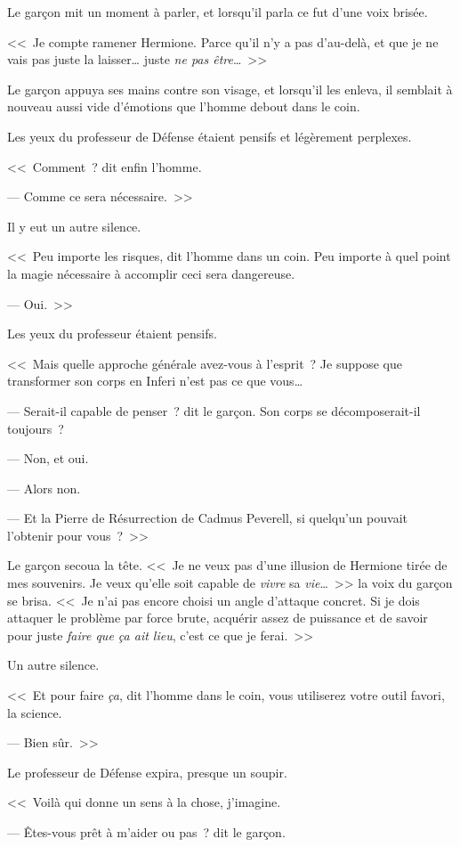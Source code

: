 Le garçon mit un moment à parler, et lorsqu'il parla ce fut d'une voix brisée.

<<~Je compte ramener Hermione. Parce qu'il n'y a pas d'au-delà, et que je ne vais pas juste la laisser… juste \emph{ne pas être}…~>>

Le garçon appuya ses mains contre son visage, et lorsqu'il les enleva, il semblait à nouveau aussi vide d'émotions que l'homme debout dans le coin.

Les yeux du professeur de Défense étaient pensifs et légèrement perplexes.

<<~Comment~? dit enfin l'homme.

--- Comme ce sera nécessaire.~>>

Il y eut un autre silence.

<<~Peu importe les risques, dit l'homme dans un coin. Peu importe à quel point la magie nécessaire à accomplir ceci sera dangereuse.

--- Oui.~>>

Les yeux du professeur étaient pensifs.

<<~Mais quelle approche générale avez-vous à l'esprit~? Je suppose que transformer son corps en Inferi n'est pas ce que vous…

--- Serait-il capable de penser~? dit le garçon. Son corps se décomposerait-il toujours~?

--- Non, et oui.

--- Alors non.

--- Et la Pierre de Résurrection de Cadmus Peverell, si quelqu'un pouvait l'obtenir pour vous~?~>>

Le garçon secoua la tête. <<~Je ne veux pas d'une illusion de Hermione tirée de mes souvenirs. Je veux qu'elle soit capable de \emph{vivre} sa \emph{vie}…~>> la voix du garçon se brisa. <<~Je n'ai pas encore choisi un angle d'attaque concret. Si je dois attaquer le problème par force brute, acquérir assez de puissance et de savoir pour juste \emph{faire que ça ait lieu}, c'est ce que je ferai.~>>

Un autre silence.

<<~Et pour faire \emph{ça}, dit l'homme dans le coin, vous utiliserez votre outil favori, la science.

--- Bien sûr.~>>

Le professeur de Défense expira, presque un soupir.

<<~Voilà qui donne un sens à la chose, j'imagine.

--- Êtes-vous prêt à m'aider ou pas~? dit le garçon.


